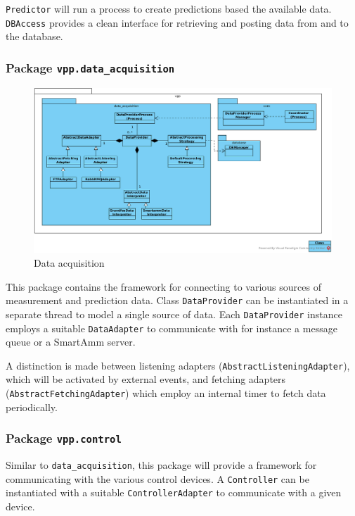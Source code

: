 \texttt{Predictor} will run a process to create predictions based the available data.\\

\texttt{DBAccess} provides a clean interface for retrieving and posting data from and to the database. 

\subsubsection{Package \texttt{vpp.data\_acquisition}}

\begin{figure}[H]
    \centering
    \includegraphics[width=\textwidth]{figures/class_data_acquisition}
    \caption{Data acquisition}
    \label{figureClassDiagram}
\end{figure}

This package contains the framework for connecting to various sources of measurement and prediction data. Class \texttt{DataProvider} can be instantiated in a separate thread to model a single source of data. Each \texttt{DataProvider} instance employs a suitable \texttt{DataAdapter} to communicate with for instance a message queue or a SmartAmm server.

A distinction is made between listening adapters (\texttt{AbstractListeningAdapter}), which will be activated by external events, and fetching adapters (\texttt{AbstractFetchingAdapter}) which employ an internal timer to fetch data periodically.

\subsubsection{Package \texttt{vpp.control}}
Similar to \texttt{data\_acquisition}, this package will provide a framework for communicating with the various control devices. A \texttt{Controller} can be instantiated with a suitable \texttt{ControllerAdapter} to communicate with a given device. 


